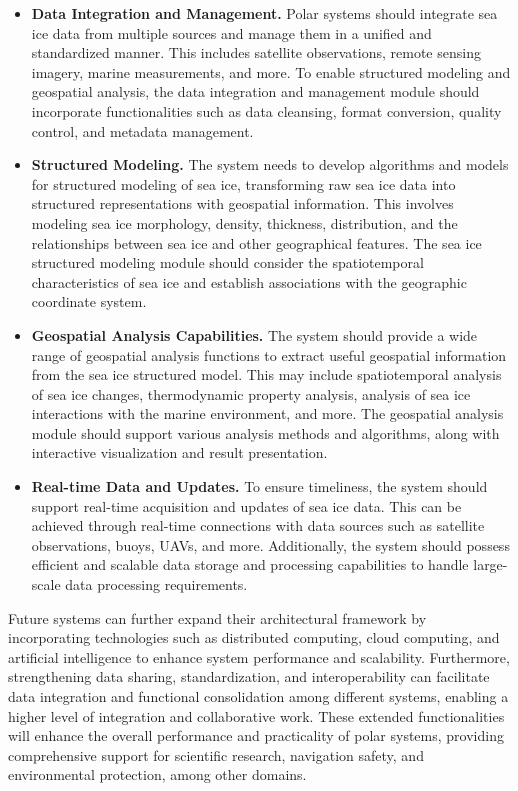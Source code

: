 \begin{itemize}
\item \textbf{Data Integration and Management.} Polar systems should integrate sea ice data from multiple sources and manage them in a unified and standardized manner. This includes satellite observations, remote sensing imagery, marine measurements, and more. To enable structured modeling and geospatial analysis, the data integration and management module should incorporate functionalities such as data cleansing, format conversion, quality control, and metadata management.

\item \textbf{Structured Modeling.} The system needs to develop algorithms and models for structured modeling of sea ice, transforming raw sea ice data into structured representations with geospatial information. This involves modeling sea ice morphology, density, thickness, distribution, and the relationships between sea ice and other geographical features. The sea ice structured modeling module should consider the spatiotemporal characteristics of sea ice and establish associations with the geographic coordinate system.

\item \textbf{Geospatial Analysis Capabilities.} The system should provide a wide range of geospatial analysis functions to extract useful geospatial information from the sea ice structured model. This may include spatiotemporal analysis of sea ice changes, thermodynamic property analysis, analysis of sea ice interactions with the marine environment, and more. The geospatial analysis module should support various analysis methods and algorithms, along with interactive visualization and result presentation.

\item \textbf{Real-time Data and Updates.} To ensure timeliness, the system should support real-time acquisition and updates of sea ice data. This can be achieved through real-time connections with data sources such as satellite observations, buoys, UAVs, and more. Additionally, the system should possess efficient and scalable data storage and processing capabilities to handle large-scale data processing requirements.
\end{itemize}

Future systems can further expand their architectural framework by incorporating technologies such as distributed computing, cloud computing, and artificial intelligence to enhance system performance and scalability. Furthermore, strengthening data sharing, standardization, and interoperability can facilitate data integration and functional consolidation among different systems, enabling a higher level of integration and collaborative work. These extended functionalities will enhance the overall performance and practicality of polar systems, providing comprehensive support for scientific research, navigation safety, and environmental protection, among other domains.


